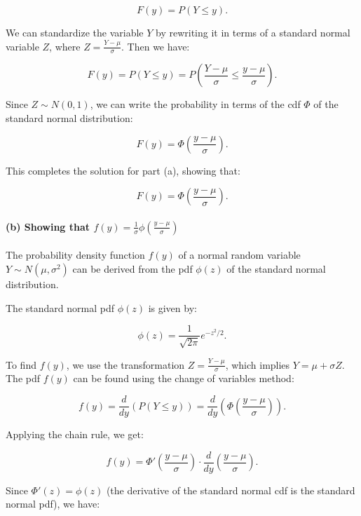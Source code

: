 \documentclass[
]{article}
\begin{document}
\[
F(y) = P(Y \leq y).
\]

We can standardize the variable \(Y\) by rewriting it in terms of a
standard normal variable \(Z\), where \(Z = \frac{Y - \mu}{\sigma}\).
Then we have:

\[
F(y) = P(Y \leq y) = P \left( \frac{Y - \mu}{\sigma} \leq \frac{y - \mu}{\sigma} \right).
\]

Since \(Z \sim N(0, 1)\), we can write the probability in terms of the
cdf \(\Phi\) of the standard normal distribution:

\[
F(y) = \Phi \left( \frac{y - \mu}{\sigma} \right).
\]

This completes the solution for part (a), showing that:

\[
F(y) = \Phi \left( \frac{y - \mu}{\sigma} \right).
\]

\hypertarget{b-showing-that-fy-frac1sigma-phi-left-fracy---musigma-right}{%
\paragraph{\texorpdfstring{(b) Showing that
\(f(y) = \frac{1}{\sigma} \phi \left( \frac{y - \mu}{\sigma} \right)\)}{(b) Showing that f(y) = \textbackslash frac\{1\}\{\textbackslash sigma\} \textbackslash phi \textbackslash left( \textbackslash frac\{y - \textbackslash mu\}\{\textbackslash sigma\} \textbackslash right)}}\label{b-showing-that-fy-frac1sigma-phi-left-fracy---musigma-right}}

The probability density function \(f(y)\) of a normal random variable
\(Y \sim N(\mu, \sigma^2)\) can be derived from the pdf \(\phi(z)\) of
the standard normal distribution.

The standard normal pdf \(\phi(z)\) is given by:

\[
\phi(z) = \frac{1}{\sqrt{2 \pi}} e^{-z^2 / 2}.
\]

To find \(f(y)\), we use the transformation
\(Z = \frac{Y - \mu}{\sigma}\), which implies \(Y = \mu + \sigma Z\).
The pdf \(f(y)\) can be found using the change of variables method:

\[
f(y) = \frac{d}{dy} \left( P(Y \leq y) \right) = \frac{d}{dy} \left( \Phi \left( \frac{y - \mu}{\sigma} \right) \right).
\]

Applying the chain rule, we get:

\[
f(y) = \Phi' \left( \frac{y - \mu}{\sigma} \right) \cdot \frac{d}{dy} \left( \frac{y - \mu}{\sigma} \right).
\]

Since \(\Phi'(z) = \phi(z)\) (the derivative of the standard normal cdf
is the standard normal pdf), we have:
\end{document}
